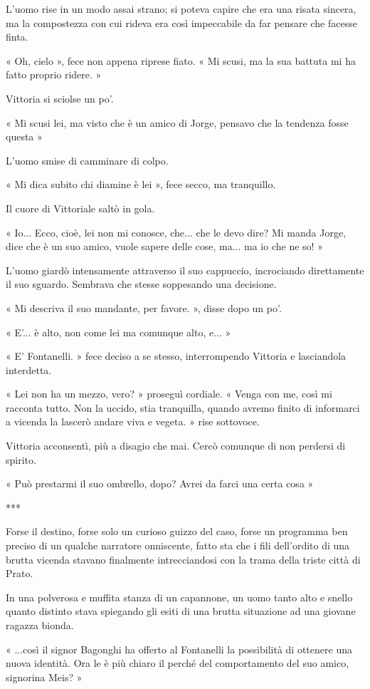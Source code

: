 L'uomo rise in un modo assai strano; si poteva capire che era una risata sincera, ma la compostezza con cui rideva era così impeccabile da far pensare che facesse finta.

« Oh, cielo », fece non appena riprese fiato. « Mi scusi, ma la sua battuta mi ha fatto proprio ridere. »

Vittoria si sciolse un po'.

« Mi scusi lei, ma visto che è un amico di Jorge, pensavo che la tendenza fosse questa »

L'uomo smise di camminare di colpo.

« Mi dica subito chi diamine è lei », fece secco, ma tranquillo.

Il cuore di Vittoriale saltò in gola.

« Io... Ecco, cioè, lei non mi conosce, che... che le devo dire? Mi manda Jorge, dice che è un suo amico, vuole sapere delle cose, ma... ma io che ne so! »

L'uomo giardò intensamente attraverso il suo cappuccio, incrociando direttamente il suo sguardo. Sembrava che stesse soppesando una decisione.

« Mi descriva il suo mandante, per favore. », disse dopo un po'.

« E'... è alto, non come lei ma comunque alto, e... »

« E' Fontanelli. » fece deciso a se stesso, interrompendo Vittoria e lasciandola interdetta.

« Lei non ha un mezzo, vero? » proseguì cordiale. « Venga con me, così mi racconta tutto. Non la uccido, stia tranquilla, quando avremo finito di informarci a vicenda la lascerò andare viva e vegeta. » rise sottovoce.

Vittoria acconsentì, più a disagio che mai. Cercò comunque di non perdersi di spirito.

« Può prestarmi il suo ombrello, dopo? Avrei da farci una certa cosa »

***

Forse il destino, forse solo un curioso guizzo del caso, forse un programma ben preciso di un qualche narratore onniscente, fatto sta che i fili dell'ordito di una brutta vicenda stavano finalmente intrecciandosi con la trama della triste città di Prato. 

In una polverosa e muffita stanza di un capannone, un uomo tanto alto e snello quanto distinto stava spiegando gli esiti di una brutta situazione ad una giovane ragazza bionda.

« ...così il signor Bagonghi ha offerto al Fontanelli la possibilità di ottenere una nuova identità. Ora le è più chiaro il perché del comportamento del suo amico, signorina Meis? »

